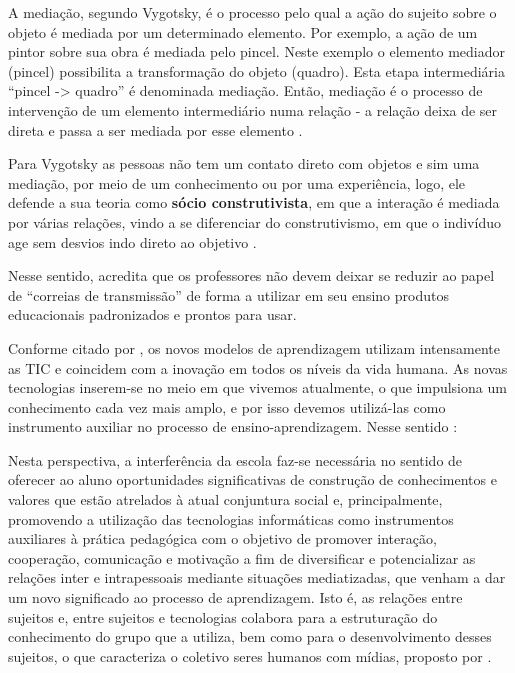 A mediação, segundo Vygotsky, é o processo pelo qual a ação do sujeito sobre o objeto é mediada por um determinado elemento. Por exemplo, a ação de um pintor sobre sua obra é mediada pelo pincel. Neste exemplo o elemento mediador (pincel) possibilita a transformação do objeto (quadro). Esta etapa intermediária “pincel -> quadro” é denominada mediação. Então, mediação é o processo de intervenção de um elemento intermediário numa relação - a relação deixa de ser direta e passa a ser mediada por esse elemento \cite{richit2004implicaccoes}.


Para Vygotsky as pessoas não tem um contato direto com objetos e sim uma mediação, por meio de um conhecimento ou por uma experiência, logo, ele defende a sua teoria como \textbf{sócio construtivista}, em que a interação é mediada por várias relações, vindo a se diferenciar do construtivismo, em que o indivíduo age sem desvios indo direto ao objetivo \cite{magalhaes2007perspectiva}.






Nesse sentido,  acredita que os professores não devem deixar se reduzir ao papel de “correias de transmissão” de forma a utilizar em seu ensino produtos educacionais padronizados e prontos para usar.


Conforme citado por , os novos modelos de aprendizagem utilizam intensamente as TIC e coincidem com a inovação em todos os níveis da vida humana. As novas tecnologias inserem-se no meio em que vivemos atualmente, o que impulsiona um conhecimento cada vez mais amplo, e por isso devemos utilizá-las como instrumento auxiliar no processo de ensino-aprendizagem. Nesse sentido \cite{richit2004implicaccoes}:

\begin{citacao}
Nesta perspectiva, a interferência da escola faz-se necessária no sentido de oferecer ao aluno oportunidades significativas de construção de conhecimentos e valores que estão atrelados à atual conjuntura social e, principalmente, promovendo a utilização das tecnologias informáticas como instrumentos auxiliares à prática pedagógica com o objetivo de promover interação, cooperação, comunicação e motivação a fim de diversificar e potencializar as relações inter e intrapessoais mediante situações mediatizadas, que venham a dar um novo significado ao processo de aprendizagem. Isto é, as relações entre sujeitos e, entre sujeitos e tecnologias colabora para a estruturação do conhecimento do grupo que a utiliza, bem como para o desenvolvimento desses sujeitos, o que caracteriza o coletivo seres humanos com mídias, proposto por .
\end{citacao}

